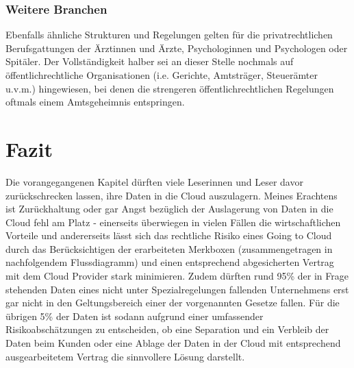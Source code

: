 \documentclass[a4paper,pointlessnumbers]{scrreprt}
\begin{document}
\subsection{Weitere Branchen}
Ebenfalls ähnliche Strukturen und Regelungen gelten für die privatrechtlichen Berufsgattungen der Ärztinnen und Ärzte, Psychologinnen und Psychologen oder Spitäler. Der Vollständigkeit halber sei an dieser Stelle nochmals auf öffentlichrechtliche Organisationen (i.e. Gerichte, Amtsträger, Steuerämter u.v.m.) hingewiesen, bei denen die strengeren öffentlichrechtlichen Regelungen oftmals einem Amtsgeheimnis entspringen.


\chapter{Fazit}
Die vorangegangenen Kapitel dürften viele Leserinnen und Leser davor zurückschrecken lassen, ihre Daten in die Cloud auszulagern. Meines Erachtens ist Zurückhaltung oder gar Angst bezüglich der Auslagerung von Daten in die Cloud fehl am Platz - einerseits überwiegen in vielen Fällen die wirtschaftlichen Vorteile und andererseits lässt sich das rechtliche Risiko eines Going to Cloud durch das Berücksichtigen der erarbeiteten Merkboxen (zusammengetragen in nachfolgendem Flussdiagramm) und einen entsprechend abgesicherten Vertrag mit dem Cloud Provider stark minimieren. Zudem dürften rund 95\% der in Frage stehenden Daten eines nicht unter Spezialregelungen fallenden Unternehmens erst gar nicht in den Geltungsbereich einer der vorgenannten Gesetze fallen. Für die übrigen 5\% der Daten ist sodann aufgrund einer umfassender Risikoabschätzungen zu entscheiden, ob eine Separation und ein Verbleib der Daten beim Kunden oder eine Ablage der Daten in der Cloud mit entsprechend ausgearbeitetem Vertrag die sinnvollere Lösung darstellt.
\end{document}
